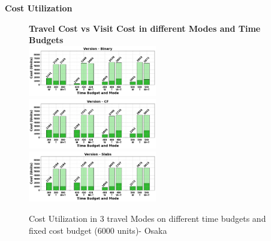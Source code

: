 \noindent\textbf{Cost Utilization}

\begin{figure}[H]
\textbf{Travel Cost vs Visit Cost in different Modes and Time Budgets}\\
\includegraphics[width=0.5\textwidth]{plots/CU3_pkj.png}
\includegraphics[width=0.5\textwidth]{plots/CU1_pkj.png}
\includegraphics[width=0.5\textwidth]{plots/CU2_pkj.png}
\hspace{8pt}
\caption{Cost Utilization in 3 travel Modes on different time budgets and fixed cost budget (6000 units)- Osaka}
\label{fig:CostUtilization1}
\end{figure}

